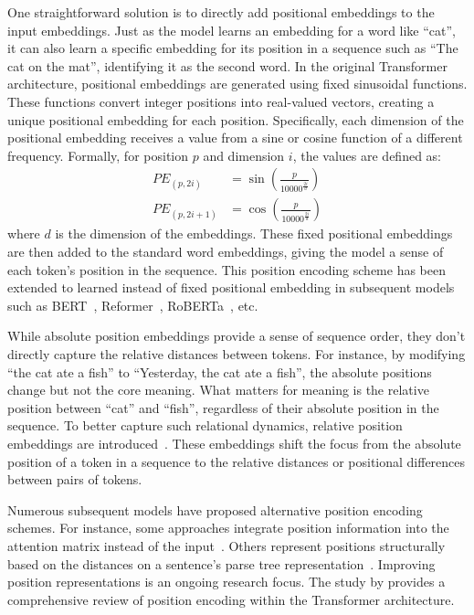One straightforward solution is to directly add positional embeddings to the input embeddings. Just as the model learns an embedding for a word like ``cat'', it can also learn a specific embedding for its position in a sequence such as ``The cat on the mat'', identifying it as the second word. In the original Transformer architecture, positional embeddings are generated using fixed sinusoidal functions. These functions convert integer positions into real-valued vectors, creating a unique positional embedding for each position. Specifically, each dimension of the positional embedding receives a value from a sine or cosine function of a different frequency. Formally, for position $p$ and dimension $i$, the values are defined as:
\begin{align}
    PE_{(p,2i)} &= \sin\left(\frac{p}{10000^{\frac{2i}{d}}}\right) \nonumber \\
    PE_{(p,2i+1)} &= \cos\left(\frac{p}{10000^{\frac{2i}{d}}}\right)
\end{align} %
where $d$ is the dimension of the embeddings.  These fixed positional embeddings are then added to the standard word embeddings, giving the model a sense of each token's position in the sequence. This position encoding scheme has been extended to learned instead of fixed positional embedding in subsequent models such as BERT~\citep{devlin-etal-2019-bert}, Reformer~\citep{kitaev2020reformer}, RoBERTa~\citep{liu2019roberta}, etc. 

While absolute position embeddings provide a sense of sequence order, they don't directly capture the relative distances between tokens. For instance, by modifying ``the cat ate a fish'' to ``Yesterday, the cat ate a fish'', the absolute positions change but not the core meaning. What matters for meaning is the relative position between ``cat'' and ``fish'', regardless of their absolute position in the sequence. To better capture such relational dynamics, relative position embeddings are introduced~\citep{shaw-etal-2018-self,dai-etal-2019-transformer}. These embeddings shift the focus from the absolute position of a token in a sequence to the relative distances or positional differences between pairs of tokens.


Numerous subsequent models have proposed alternative position encoding schemes. For instance, some approaches integrate position information into the attention matrix instead of the input~\citep{dai-etal-2019-transformer,2020t5}. Others represent positions structurally based on the distances on a sentence's parse tree representation~\citep{wang-etal-2019-self,shiv2019novel}. Improving position representations is an ongoing research focus. The study by \cite{dufter-etal-2022-position} provides a comprehensive review of position encoding within the Transformer architecture.


